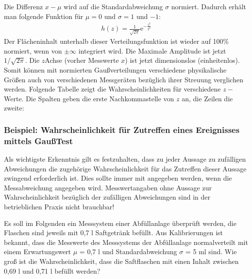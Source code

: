 \documentclass[letterpaper,10pt,english]{jupyterBook}
\begin{document}
\sphinxAtStartPar
Die Differenz \(x-\mu\) wird auf die Standardabweichung \(\sigma\) normiert. Dadurch erhält man folgende Funktion für \(\mu = 0\) und \(\sigma = 1\) und \(-1\):
\begin{equation*}
\begin{split}h(z) = \frac{1}{\sqrt{2\pi}}\mathrm e^{-\frac{z^2}{2 ^2}} \end{split}
\end{equation*}
\sphinxAtStartPar
Der Flächeninhalt unterhalb dieser Verteilungsfunktion ist wieder auf 100\% normiert, wenn von \(\pm \infty\) integriert wird. Die Maximale Amplitude ist jetzt \(1/\sqrt{2 \pi}\). Die \(z\)\sphinxhyphen{}Achse (vorher Messwerte \(x\)) ist jetzt dimensionslos (einheitenlos). Somit können mit normierten Gaußverteilungen verschiedene physikalische Größen auch von verschiedenen Messgeräten bezüglich ihrer Streuung verglichen werden.
Folgende Tabelle zeigt die Wahrscheinlichkeiten für verschiedene \(z-\)Werte. Die Spalten geben die erste Nachkommastelle von \(z\) an, die Zeilen die zweite:

\sphinxAtStartPar
{}


\subsubsection{Beispiel: Wahrscheinlichkeit für Zutreffen eines Ereignisses mittels Gauß\sphinxhyphen{}Test}
\label{\detokenize{content/1_Mittelwert_StdAbw:beispiel-wahrscheinlichkeit-fur-zutreffen-eines-ereignisses-mittels-gausz-test}}
\sphinxAtStartPar
Als wichtigste Erkenntnis gilt es festzuhalten, dass zu jeder Aussage zu zufälligen Abweichungen die zugehörige Wahrscheinlichkeit für das Zutreffen dieser Aussage zwingend erforderlich ist. Dies sollte immer mit angegeben werden, wenn die Messabweichung angegeben wird.
Messwertangaben ohne Aussage zur Wahrscheinlichkeit bezüglich der zufälligen Abweichungen sind in der betrieblichen Praxis nicht brauchbar!

\sphinxAtStartPar
Es soll im Folgenden ein Messsystem einer Abfüllanlage überprüft werden, die Flaschen sind jeweils mit 0,7 l Saftgetränk befüllt.
Aus Kalibrierungen ist bekannt, dass die Messwerte des Messsystems der Abfüllanlage normalverteilt mit einem Erwartungswert \(\mu\) = 0,7 l und Standardabweichung \(\sigma\) = 5 ml sind.
Wie groß ist die Wahrscheinlichkeit, dass die Saftflaschen mit einen Inhalt zwischen 0,69 l und 0,71 l befüllt werden?
\end{document}
